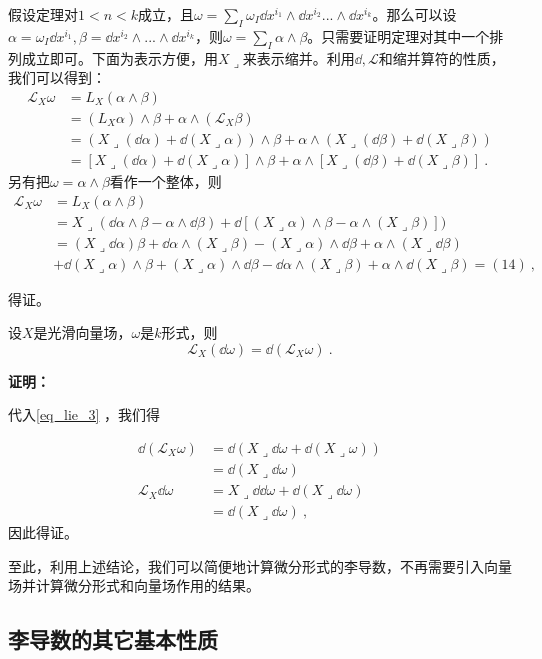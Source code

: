 假设定理对$1<n<k$成立，且$\omega=\sum_{I}\omega_I\dd x^{i_1}\wedge\dd x^{i_2}...\wedge \dd x^{i_k}$。那么可以设$\alpha=\omega_I\dd x^{i_1},\beta=\dd x^{i_2}\wedge...\wedge\dd x^{i_k}$，则$\omega=\sum_I\alpha\wedge\beta$。只需要证明定理对其中一个排列成立即可。下面为表示方便，用$X\lrcorner$来表示缩并。利用$\dd,\mathcal L$和缩并算符的性质，我们可以得到：
\begin{equation}
\begin{aligned}
\mathcal L_X\omega&=L_X(\alpha\wedge\beta)\\
&=(L_X\alpha)\wedge\beta+\alpha\wedge (\mathcal L_X\beta)\\
&=(X\lrcorner(\dd \alpha)+\dd (X\lrcorner\alpha))\wedge\beta+\alpha\wedge(X\lrcorner(\dd \beta)+\dd (X\lrcorner\beta))\\
&=[X\lrcorner(\dd \alpha)+\dd(X\lrcorner\alpha)]\wedge\beta+\alpha\wedge[X\lrcorner(\dd \beta)+\dd(X\lrcorner\beta)]~.
\end{aligned}
\end{equation}
另有把$\omega=\alpha\wedge\beta$看作一个整体，则
\begin{equation}
\begin{aligned}
\mathcal L_X\omega&=L_X(\alpha\wedge\beta)\\
&=X\lrcorner(\dd\alpha\wedge\beta-\alpha\wedge\dd\beta)+\dd[(X\lrcorner\alpha)\wedge\beta-\alpha\wedge(X\lrcorner\beta)])\\
&=(X\lrcorner\dd\alpha)\beta+\dd\alpha\wedge(X\lrcorner\beta)-(X\lrcorner\alpha)\wedge\dd\beta+\alpha\wedge(X\lrcorner\dd\beta)\\
&+\dd(X\lrcorner\alpha)\wedge\beta+(X\lrcorner\alpha)\wedge\dd\beta-\dd\alpha\wedge(X\lrcorner\beta)+\alpha\wedge\dd(X\lrcorner\beta)=(14)~,
\end{aligned}
\end{equation}

得证。

\begin{corollary}{}
设$X$是光滑向量场，$\omega$是$k$形式，则
\begin{equation}
\mathcal L_X(\dd\omega)=\dd(\mathcal L_X\omega)~.
\end{equation}
\end{corollary}
\textbf{证明：}

代入\autoref{eq_lie_3} ，我们得

\begin{equation}
\begin{aligned}
\dd(\mathcal L_X\omega)&=\dd(X\lrcorner\dd\omega+\dd(X\lrcorner\omega))\\
&=\dd(X\lrcorner\dd\omega)\\
\mathcal L_X\dd \omega&=X\lrcorner\dd\dd\omega+\dd(X\lrcorner\dd\omega)\\
&=\dd(X\lrcorner\dd\omega)~,
\end{aligned}
\end{equation}
因此得证。

至此，利用上述结论，我们可以简便地计算微分形式的李导数，不再需要引入向量场并计算微分形式和向量场作用的结果。
\subsection{李导数的其它基本性质}
